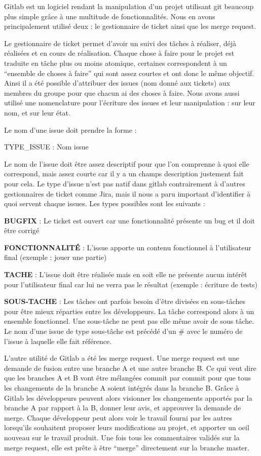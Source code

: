 \hspace{3em}
Gitlab est un logiciel rendant la manipulation d’un projet utilisant git beaucoup plus simple grâce à une multitude de fonctionnalités. Nous en avons principalement utilisé deux : le gestionnaire de ticket ainsi que les merge request.

	Le gestionnaire de ticket permet d’avoir un suivi des tâches à réaliser, déjà réalisées et en cours de réalisation. Chaque chose à faire pour le projet est traduite en tâche plus ou moins atomique, certaines correspondent à un “ensemble de choses à faire” qui sont assez courtes et ont donc le même objectif. Ainsi il a été possible d’attribuer des issues (nom donné aux tickets) aux membres du groupe pour que chacun ai des choses à faire. Nous avons aussi utilisé une nomenclature pour l’écriture des issues et leur manipulation : sur leur nom, et sur leur état.

	Le nom d’une issue doit prendre la forme :

	TYPE\_ISSUE : Nom issue

Le nom de l’issue doit être assez descriptif pour que l’on comprenne à quoi elle correspond, mais assez courte car il y a un champs description justement fait pour cela.
Le type d’issue n’est pas natif dans gitlab contrairement à d’autres gestionnaires de ticket comme Jira, mais il nous a paru important d’identifier à quoi servent chaque issues.
Les types possibles sont les suivants :

\textbf{BUGFIX} : Le ticket est ouvert car une fonctionnalité présente un bug et il doit être corrigé

\textbf{FONCTIONNALITÉ} : L’issue apporte un contenu fonctionnel à l’utilisateur final (exemple : jouer une partie)

\textbf{TACHE} : L’issue doit être réalisée mais en soit elle ne présente aucun intérêt pour l’utilisateur final car lui ne verra pas le résultat (exemple : écriture de tests)

\textbf{SOUS-TACHE} : Les tâches ont parfois besoin d’être divisées en sous-tâches pour être mieux réparties entre les développeurs. La tâche correspond alors à un ensemble fonctionnel. Une sous-tâche ne peut pas elle même avoir de sous tâche. Le nom d’une issue de type sous-tâche est précédé d’un \# avec le numéro de l’issue à laquelle elle fait référence.

	L’autre utilité de Gitlab a été les merge request. Une merge request est une demande de fusion entre une branche A et une autre branche B. Ce qui veut dire que les branches A et B vont être mélangées commit par commit pour que tous les changements de la branche A soient intégrés dans la branche B.
Grâce à Gitlab les développeurs peuvent alors visionner les changements apportés par la branche A par rapport à la B, donner leur avis, et approuver la demande de merge.
Chaque développeur peut alors voir le travail fourni par les autres lorsqu’ils souhaitent proposer leurs modifications au projet, et apporter un oeil nouveau sur le travail produit. Une fois tous les commentaires validés sur la merge request, elle est prête à être “merge” directement sur la branche master.

